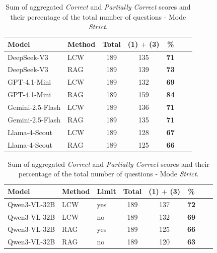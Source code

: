 \begin{table}[htbp]
    \centering
    \caption[\textit{Answered} scores - \textit{Correct} $+$ \textit{Partially Correct}]{Sum of aggregated \textit{Correct} and \textit{Partially Correct} scores and their percentage of the total number of questions - Mode \textit{Strict}.}
    \label{tab:total_strict_combined_scores_answered}
    
    \begin{threeparttable}
        \small 
        \begin{tabular}{llccccc}
            \toprule
            \textbf{Model} & \textbf{Method} & \textbf{Total} & \textbf{(1)} $+$ \textbf{(3)} & \textbf{\%} \\
            \midrule
            DeepSeek-V3 & LCW & 189 & 135 & \textbf{71} \\
            \rowcolor{gray!10} DeepSeek-V3 & RAG & 189 & 139 & \textbf{73} \\
            \addlinespace
            GPT-4.1-Mini & LCW & 189 & 132 & \textbf{69} \\
            \rowcolor{gray!10} GPT-4.1-Mini & RAG & 189 & 159 & \textbf{84} \\
            \addlinespace
            Gemini-2.5-Flash & LCW & 189 & 136 & \textbf{71} \\
            \rowcolor{gray!10} Gemini-2.5-Flash & RAG & 189 & 135 & \textbf{71} \\
            \addlinespace
            Llama-4-Scout & LCW & 189 & 128 & \textbf{67} \\
            \rowcolor{gray!10} Llama-4-Scout & RAG & 189 & 125 & \textbf{66} \\
            \bottomrule
        \end{tabular}
    \end{threeparttable}
    
    \vspace{1.5em}
    
    \begin{threeparttable}
        \small
        \begin{tabular}{lllccccc}
            \toprule
            \textbf{Model} & \textbf{Method} & \textbf{Limit} & \textbf{Total} & \textbf{(1)} $+$ \textbf{(3)} & \textbf{\%} \\
            \midrule
            Qwen3-VL-32B & LCW & yes & 189 & 137 & \textbf{72} \\
            Qwen3-VL-32B & LCW & no & 189 & 132 & \textbf{69} \\
            \rowcolor{gray!10} Qwen3-VL-32B & RAG & yes & 189 & 125 & \textbf{66} \\
            \rowcolor{gray!10} Qwen3-VL-32B & RAG & no & 189 & 120 & \textbf{63} \\
            \bottomrule
        \end{tabular}
        

\end{threeparttable}
\end{table}

